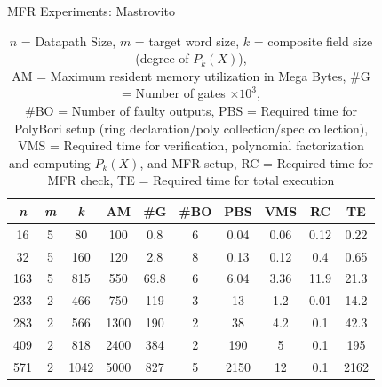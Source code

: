 \begin{frame}{\large MFR Experiments: Mastrovito}
{\scriptsize
\begin{table}[bht]
\centering
\caption*{{\scriptsize $\textit{n}$ = Datapath Size, $\textit{m}$ = target word size, 
$\textit{k}$ = composite field size (degree of $P_k(X)$),\\ 
AM = Maximum resident memory utilization in Mega Bytes,
\#G = Number of gates $\times 10^3$,\\ \#BO = Number of faulty outputs, 
PBS = Required time for PolyBori setup (ring declaration/poly collection/spec collection),
VMS = Required time for verification, polynomial factorization and computing $P_k(X)$, and MFR setup, 
RC = Required time for MFR check, TE = Required time for total execution}}
\label{masvsspec}
\begin{tabular}{| c | c | c | c | c | c | c | c | c | c |} \hline
{\textit{\textbf{n}}} & {\textit{\textbf{m}}} & {\textit{\textbf{k}}} & {\textbf{AM}} & {\textbf{\#G}} 
& {\textbf{\#BO}} & {\textbf{PBS}} & {\textbf{VMS}} & {\textbf{RC}} & {\textbf{TE}} \\ \hline 
16  & 5 & 80   & 100 & 0.8  & 6  & 0.04 & 0.06  & 0.12  & 0.22 \\ \hline
32  & 5 & 160  & 120 & 2.8  & 8  & 0.13 & 0.12  & 0.4   & 0.65 \\ \hline
163 & 5 & 815  & 550 & 69.8 & 6  & 6.04 & 3.36  & 11.9  & 21.3 \\ \hline
233 & 2 & 466  & 750 & 119  & 3  & 13   & 1.2   & 0.01  & 14.2 \\ \hline
283 & 2 & 566  & 1300& 190  & 2  & 38   & 4.2   & 0.1   & 42.3 \\ \hline
409 & 2 & 818  & 2400& 384  & 2  & 190  & 5     & 0.1   & 195  \\ \hline
\rowcolor{green}571 & 2 & 1042 & 5000& 827  & 5  & 2150 & 12    & 0.1   & 2162 \\ \hline
\end{tabular}
\end{table}}

\end{frame}

